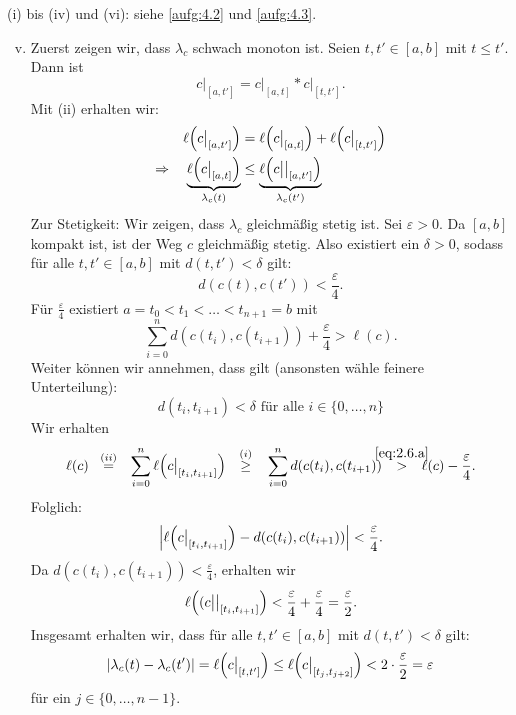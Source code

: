 \begin{beweis}
	(i) bis (iv) und (vi): siehe \autoref{aufg:4.2} und \autoref{aufg:4.3}.
	\begin{enumerate}[(i)]
		\setcounter{enumi}{4}
		\item Zuerst zeigen wir, dass $\lambda_c$ schwach monoton ist.
		Seien $t, t' \in [a,b]$ mit $t \leq t'$.
		Dann ist
		\[
			c \big|_{[a,t']} = c \big|_{[a,t]} * c\big|_{[t,t']}.
		\]
		Mit (ii) erhalten wir:
		\begin{align*}
			\ell\enbrace*{c \big|_{[a,t']}} &= \ell \enbrace*{c \big|_{[a,t]}} + \ell \enbrace*{c\big|_{[t,t']}} \\
			\Rightarrow \quad \Underbrace{\ell\enbrace*{c \big|_{[a,t]}}}{\lambda_c(t)} &\leq \Underbrace{\ell\enbrace*{c \big|\big|_{[a,t']}}}{\lambda_c(t')}
		\end{align*}
		Zur Stetigkeit:
		Wir zeigen, dass $\lambda_c$ gleichmäßig stetig ist.
		Sei $\varepsilon > 0$.
		Da $[a,b]$ kompakt ist, ist der Weg $c$ gleichmäßig stetig.
		Also existiert ein $\delta > 0$, sodass für alle $t, t' \in [a,b]$ mit $d(t,t') < \delta$ gilt:
		\[
			d(c(t),c(t')) < \frac{\varepsilon}{4}.
		\]
		Für $\frac{\varepsilon}{4}$ existiert $a = t_0 < t_1 < \dots < t_{n+1} = b$ mit
		\begin{equation}
			\sum\limits_{i=0}^{n} d(c(t_i),c(t_{i+1})) + \frac{\varepsilon}{4} > \ell(c). \label{eq:2.6.a}
		\end{equation}
		Weiter können wir annehmen, dass gilt (ansonsten wähle feinere Unterteilung):
		\begin{equation}
			d(t_i,t_{i+1}) < \delta \text{ für alle } i \in \{0,\dots,n\} \label{eq:2.6.b}
		\end{equation}
		Wir erhalten
		\begin{equation}
			\ell(c) \stack{(ii)}{=} \sum\limits_{i=0}^{n} \ell\enbrace*{ c\big|_{[t_i,t_{i+1}]}} \stack{(i)}{\geq} \sum\limits_{i=0}^n d(c(t_i),c(t_{i+1})) \stack{\eqref{eq:2.6.a}}{>} \ell(c) - \frac{\varepsilon}{4}.
		\end{equation}
		Folglich:
		\[
			\abs*{\ell\enbrace*{c\big|_{[t_i,t_{i+1}]}} - d(c(t_i),c(t_{i+1}))} < \frac{\varepsilon}{4}.
		\]
		Da $d(c(t_i),c(t_{i+1})) < \frac{\varepsilon}{4}$, erhalten wir
		\[
			\ell\enbrace*{(c \big|\big|_{[t_i,t_{i+1}]}} < \frac{\varepsilon}{4} + \frac{\varepsilon}{4} = \frac{\varepsilon}{2}.
		\]
		Insgesamt erhalten wir, dass für alle $t,t' \in [a,b]$ mit $d(t,t') < \delta$ gilt:
		\[
			\abs{\lambda_c(t)-\lambda_c(t')} = \ell\enbrace*{c \big|_{[t,t']}} \leq \ell\enbrace*{c\big|_{[t_j,t_{j+2}]}} < 2 \cdot \frac{\varepsilon}{2} = \varepsilon
		\]
		für ein $j \in \{0, \dots, n-1\}$.
		

\end{enumerate}
\end{beweis}
